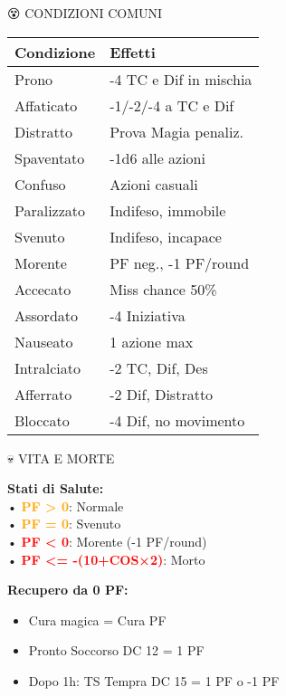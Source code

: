 \documentclass[10pt,a4paper,landscape]{article}
\newcommand{\highlight}[1]{\textcolor{orange}{\textbf{#1}}}
\newcommand{\critical}[1]{\textcolor{red}{\textbf{#1}}}
\begin{document}
\begin{multicols}{4}
		\begin{mainsection}{😵 CONDIZIONI COMUNI}
			\begin{tabular}{@{}p{2.2cm}p{3.4cm}@{}}
				\toprule
				\textbf{Condizione} & \textbf{Effetti} \\
				\midrule
				Prono & -4 TC e Dif in mischia \\
				Affaticato & -1/-2/-4 a TC e Dif \\
				Distratto & Prova Magia penaliz. \\
				Spaventato & -1d6 alle azioni \\
				Confuso & Azioni casuali \\
				Paralizzato & Indifeso, immobile \\
				Svenuto & Indifeso, incapace \\
				Morente & PF neg., -1 PF/round \\
				Accecato & Miss chance 50\% \\
				Assordato & -4 Iniziativa \\
				Nauseato & 1 azione max \\
				Intralciato & -2 TC, Dif, Des \\
				Afferrato & -2 Dif, Distratto \\
				Bloccato & -4 Dif, no movimento \\
				\bottomrule
			\end{tabular}
		\end{mainsection}
		
		\begin{mainsection}{💀 VITA E MORTE}
			\begin{formula}
				\textbf{Stati di Salute:}\\
				• \highlight{PF > 0}: Normale\\
				• \highlight{PF = 0}: Svenuto\\
				• \critical{PF < 0}: Morente (-1 PF/round)\\
				• \critical{PF <= -(10+COS×2)}: Morto
			\end{formula}
			
			\textbf{Recupero da 0 PF:}
			\begin{itemize}[noitemsep,leftmargin=8pt]
				\item Cura magica = Cura PF
				\item Pronto Soccorso DC 12 = 1 PF
				\item Dopo 1h: TS Tempra DC 15 = 1 PF o -1 PF
			\end{itemize}
			

\end{mainsection}
\end{multicols}
\end{document}
